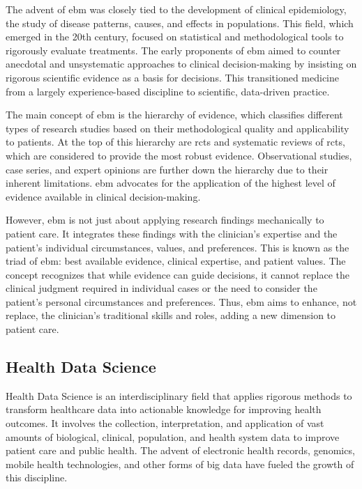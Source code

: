 The advent of \ac{ebm} was closely tied to the development of clinical epidemiology, the study of disease patterns, causes, and effects in populations. This field, which emerged in the 20th century, focused on statistical and methodological tools to rigorously evaluate treatments. The early proponents of \ac{ebm} aimed to counter anecdotal and unsystematic approaches to clinical decision-making by insisting on rigorous scientific evidence as a basis for decisions. This transitioned medicine from a largely experience-based discipline to scientific, data-driven practice.

The main concept of \ac{ebm} is the hierarchy of evidence, which classifies different types of research studies based on their methodological quality and applicability to patients. At the top of this hierarchy are \acp{rct} and systematic reviews of \acp{rct}, which are considered to provide the most robust evidence. Observational studies, case series, and expert opinions are further down the hierarchy due to their inherent limitations. \ac{ebm} advocates for the application of the highest level of evidence available in clinical decision-making.

However, \ac{ebm} is not just about applying research findings mechanically to patient care. It integrates these findings with the clinician's expertise and the patient's individual circumstances, values, and preferences. This is known as the triad of \ac{ebm}: best available evidence, clinical expertise, and patient values. The concept recognizes that while evidence can guide decisions, it cannot replace the clinical judgment required in individual cases or the need to consider the patient's personal circumstances and preferences. Thus, \ac{ebm} aims to enhance, not replace, the clinician's traditional skills and roles, adding a new dimension to patient care.


\subsection{Health Data Science}

Health Data Science is an interdisciplinary field that applies rigorous methods to transform healthcare data into actionable knowledge for improving health outcomes. It involves the collection, interpretation, and application of vast amounts of biological, clinical, population, and health system data to improve patient care and public health. The advent of electronic health records, genomics, mobile health technologies, and other forms of big data have fueled the growth of this discipline.

